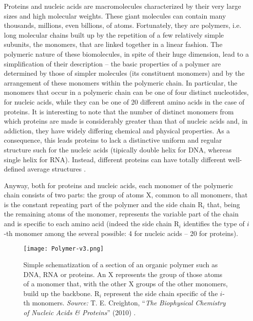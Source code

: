 Proteins and nucleic acids are macromolecules characterized by their very large sizes and high molecular weights. These giant molecules can contain many thousands, millions, even billions, of atoms. Fortunately, they are polymers, i.e. long molecular chains built up by the repetition of a few relatively simple subunits, the monomers, that are linked together in a linear fashion. The polymeric nature of these biomolecules, in spite of their huge dimension, lead to a simplification of their description -- the basic properties of a polymer are determined by those of simpler molecules (its constituent monomers) and by the arrangement of these monomers within the polymeric chain. In particular, the monomers that occur in a polymeric chain can be one of four distinct nucleotides, for nucleic acids, while they can be one of 20 different amino acids in the case of proteins. It is interesting to note that the number of distinct monomers from which proteins are made is considerably greater than that of nucleic acids and, in addiction, they have widely differing chemical and physical properties. As a consequence, this leads proteins to lack a distinctive uniform and regular structure such for the nucleic acids (tipically double helix for DNA, whereas single helix for RNA). Instead, different proteins can have totally different well-defined average structures \cite{voet2016fundamentals}.

Anyway, both for proteins and nucleic acids, each monomer of the polymeric chain consists of two parts: 
the group of atoms X, common to all monomers, that  is the constant repeating part of the polymer and the side chain R$_i$ that, being  the remaining atoms of the monomer, represents the variable part of the chain and is specific to each amino acid (indeed the side chain R$_i$ identifies the type of $i$-th monomer among the several possible: 4 for nucleic acids -- 20 for proteins).

\begin{figure}[h]
\centering
\begin{minipage}[t]{0.75\textwidth}
\centering
\texttt{[image: Polymer-v3.png]}

\caption{\small{Simple schematization of a section of an organic polymer such as DNA, RNA or proteins. An X represents the group of those atoms of a monomer that, with the other X groups of the other monomers, build up the backbone. R$_i$ represent the side chain specific of the $i$-th monomers.
    \textit{Source:} T. E. Creighton, ``\textit{The Biophysical Chemistry of Nucleic Acids \& Proteins}'' (2010) 
    \cite{creighton2010biophysical}.}
}


\label{fig:Polymer}
\end{minipage} 
\end{figure}

